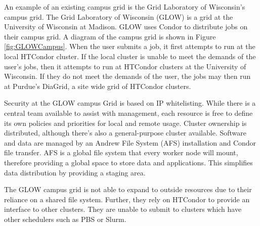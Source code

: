 An example of an existing campus grid is the Grid Laboratory of Wisconsin's campus grid.  The Grid Laboratory of Wisconsin (GLOW) \cite{gridworkshopweb, glowwebsite} is a grid at the University of Wisconsin at Madison.  GLOW uses Condor to distribute 
jobs on their campus grid.  A diagram of the campus grid is shown in Figure \ref{fig:GLOWCampus}.  When the user submits a job, it first attempts to run at the local HTCondor cluster.  If the local cluster is unable to meet the demands of the user's jobs, then it attempts to run at HTCondor clusters at the University of Wisconsin.  If they do not meet the demands of the user, the jobs may then run at Purdue's DiaGrid, a site wide grid of HTCondor clusters.

Security at the GLOW campus Grid is based on IP whitelisting.  While there is a central 
team available to assist with management, each resource is free to define its own policies and priorities for local 
and remote usage.  Cluster ownership is distributed, although there's also a general-purpose cluster available.  
Software and data are managed by an Andrew File System (AFS) \cite{morris1986andrew} installation and Condor file transfer.  AFS is a global file system
that every worker node will mount, therefore providing a global space to store data and applications.  This simplifies data distribution
by providing a staging area.

The GLOW campus grid is not able to expand to outside resources due to their reliance on a shared file system.  Further, they rely on HTCondor to provide an interface to other clusters.  They are unable to submit to clusters which have other schedulers such as PBS or Slurm.  


